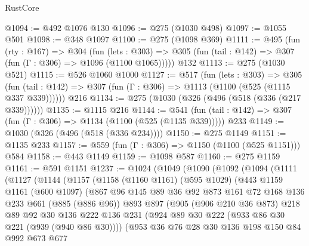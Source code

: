 \begin{lexlean}{RustCore}
\begin{coremodule}
@1094 := @492 @1076 @130
@1096 := @275 (@1030 @498)
@1097 := @1055 @501
@1098 := @348 @1097
@1100 := @275 (@1098 @369)
@1111 := @495
    (fun (rty : @167) =>
    @304
      (fun (lets : @303) =>
      @305 (fun (tail : @142) => @307 (fun (Γ : @306) => @1096 (@1100 @1065)))))
    @132
@1113 := @275 (@1030 @521)
@1115 := @526 @1060 @1000
@1127 := @517
    (fun (lets : @303) =>
    @305 (fun (tail : @142) => @307 (fun (Γ : @306) => @1113 (@1100 (@525 (@1115 @337 @339))))))
    @216
@1134 := @275 (@1030 (@326 (@496 (@518 (@336 (@217 @339))))))
@1135 := @1115 @216
@1144 := @541 (fun (tail : @142) => @307 (fun (Γ : @306) => @1134 (@1100 (@525 (@1135 @339))))) @233
@1149 := @1030 (@326 (@496 (@518 (@336 @234))))
@1150 := @275 @1149
@1151 := @1135 @233
@1157 := @559 (fun (Γ : @306) => @1150 (@1100 (@525 @1151))) @584
@1158 := @443 @1149
@1159 := @1098 @587
@1160 := @275 @1159
@1161 := @591 @1151
@1237 := @1024
    (@1049
      (@1090
        (@1092
          (@1094
            (@1111
              (@1127
                (@1144
                  (@1157
                    (@1158
                      (@1160 @1161)
                      (@595 @1029)
                      (@443
                        @1159
                        @1161
                        (@600 @1097)
                        (@867
                          @96
                          @145
                          @89
                          @36
                          @92
                          @873
                          @161
                          @72
                          @168
                          @136
                          @233
                          @661
                          (@885 (@886 @96))
                          @893
                          @897
                          (@905
                            (@906 @210 @36 @873)
                            @218
                            @89
                            @92
                            @30
                            @136
                            @222
                            @136
                            @231
                            (@924 @89 @30 @222 (@933 @86 @30 @221 (@939 (@940 @86 @30))))
                            (@953
                              @36
                              @76
                              @28
                              @30
                              @136
                              @198
                              @150
                              @84
                              @992
                              @673
                              @677

\end{coremodule}
\end{lexlean}
